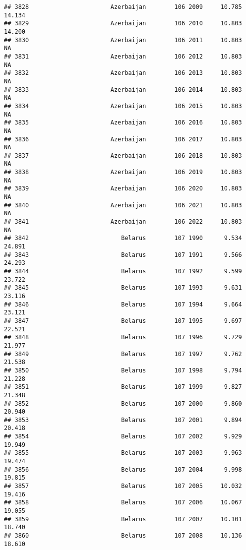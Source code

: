 \documentclass[
]{article}
\begin{document}
\begin{verbatim}
## 3828                       Azerbaijan        106 2009     10.785     14.134
## 3829                       Azerbaijan        106 2010     10.803     14.200
## 3830                       Azerbaijan        106 2011     10.803         NA
## 3831                       Azerbaijan        106 2012     10.803         NA
## 3832                       Azerbaijan        106 2013     10.803         NA
## 3833                       Azerbaijan        106 2014     10.803         NA
## 3834                       Azerbaijan        106 2015     10.803         NA
## 3835                       Azerbaijan        106 2016     10.803         NA
## 3836                       Azerbaijan        106 2017     10.803         NA
## 3837                       Azerbaijan        106 2018     10.803         NA
## 3838                       Azerbaijan        106 2019     10.803         NA
## 3839                       Azerbaijan        106 2020     10.803         NA
## 3840                       Azerbaijan        106 2021     10.803         NA
## 3841                       Azerbaijan        106 2022     10.803         NA
## 3842                          Belarus        107 1990      9.534     24.891
## 3843                          Belarus        107 1991      9.566     24.293
## 3844                          Belarus        107 1992      9.599     23.722
## 3845                          Belarus        107 1993      9.631     23.116
## 3846                          Belarus        107 1994      9.664     23.121
## 3847                          Belarus        107 1995      9.697     22.521
## 3848                          Belarus        107 1996      9.729     21.977
## 3849                          Belarus        107 1997      9.762     21.538
## 3850                          Belarus        107 1998      9.794     21.228
## 3851                          Belarus        107 1999      9.827     21.348
## 3852                          Belarus        107 2000      9.860     20.940
## 3853                          Belarus        107 2001      9.894     20.418
## 3854                          Belarus        107 2002      9.929     19.949
## 3855                          Belarus        107 2003      9.963     19.474
## 3856                          Belarus        107 2004      9.998     19.815
## 3857                          Belarus        107 2005     10.032     19.416
## 3858                          Belarus        107 2006     10.067     19.055
## 3859                          Belarus        107 2007     10.101     18.740
## 3860                          Belarus        107 2008     10.136     18.610

\end{verbatim}
\end{document}
